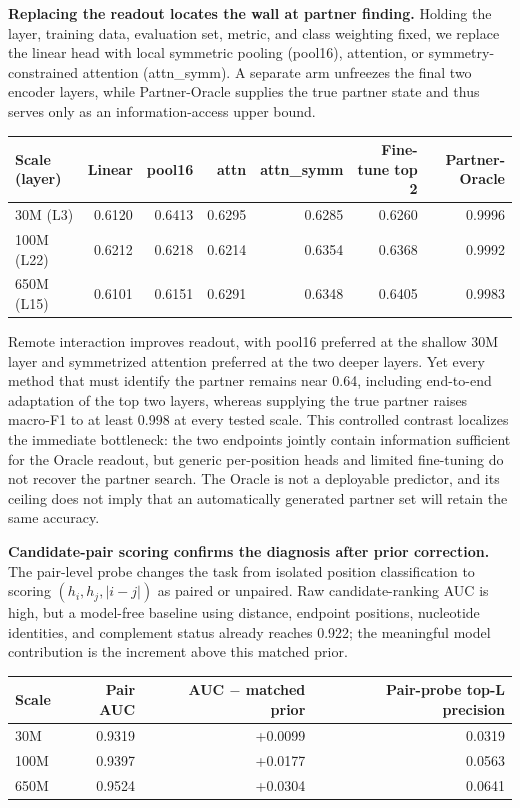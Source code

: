 \textbf{Replacing the readout locates the wall at partner finding.} Holding the layer, training data, evaluation set, metric, and class weighting fixed, we replace the linear head with local symmetric pooling (pool16), attention, or symmetry-constrained attention (attn\_symm). A separate arm unfreezes the final two encoder layers, while Partner-Oracle supplies the true partner state and thus serves only as an information-access upper bound.

\begin{longtable}[]{@{}lrrrrrr@{}}
\toprule
Scale (layer) & Linear & pool16 & attn & attn\_symm & Fine-tune top 2 & Partner-Oracle \\
\midrule
\endhead
30M (L3) & 0.6120 & 0.6413 & 0.6295 & 0.6285 & 0.6260 & 0.9996 \\
100M (L22) & 0.6212 & 0.6218 & 0.6214 & 0.6354 & 0.6368 & 0.9992 \\
650M (L15) & 0.6101 & 0.6151 & 0.6291 & 0.6348 & 0.6405 & 0.9983 \\
\bottomrule
\end{longtable}

Remote interaction improves readout, with pool16 preferred at the shallow 30M layer and symmetrized attention preferred at the two deeper layers. Yet every method that must identify the partner remains near 0.64, including end-to-end adaptation of the top two layers, whereas supplying the true partner raises macro-F1 to at least 0.998 at every tested scale. This controlled contrast localizes the immediate bottleneck: the two endpoints jointly contain information sufficient for the Oracle readout, but generic per-position heads and limited fine-tuning do not recover the partner search. The Oracle is not a deployable predictor, and its ceiling does not imply that an automatically generated partner set will retain the same accuracy.

\textbf{Candidate-pair scoring confirms the diagnosis after prior correction.} The pair-level probe changes the task from isolated position classification to scoring \((h_i,h_j,|i-j|)\) as paired or unpaired. Raw candidate-ranking AUC is high, but a model-free baseline using distance, endpoint positions, nucleotide identities, and complement status already reaches 0.922; the meaningful model contribution is the increment above this matched prior.

\begin{longtable}[]{@{}lrrr@{}}
\toprule
Scale & Pair AUC & AUC \(-\) matched prior & Pair-probe top-L precision \\
\midrule
\endhead
30M & 0.9319 & +0.0099 & 0.0319 \\
100M & 0.9397 & +0.0177 & 0.0563 \\
650M & 0.9524 & +0.0304 & 0.0641 \\
\bottomrule
\end{longtable}

